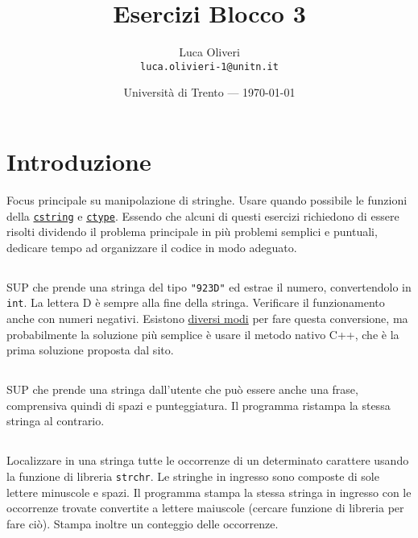 \documentclass{article}
\title{Esercizi Blocco 3} %
\author{Luca Oliveri\\ \texttt{luca.olivieri-1@unitn.it}} %
\date{Università di Trento --- \today} %
\begin{document}
\maketitle %

\section*{Introduzione} %

\setcounter{section}{3}
Focus principale su manipolazione di stringhe. Usare quando possibile le funzioni della \href{http://www.cplusplus.com/reference/cstring/}{\texttt{cstring}} e \href{http://www.cplusplus.com/reference/cctype/}{\texttt{ctype}}. Essendo che alcuni di questi esercizi richiedono di essere risolti dividendo il problema principale in più problemi semplici e puntuali, dedicare tempo ad organizzare il codice in modo adeguato.


\subsection{}
SUP che prende una stringa del tipo \texttt{"923D"} ed estrae il numero, convertendolo in \texttt{int}. La lettera D è sempre alla fine della stringa. Verificare il funzionamento anche con numeri negativi. Esistono \href{https://www.geeksforgeeks.org/converting-strings-numbers-cc/}{diversi modi} per fare questa conversione, ma probabilmente la soluzione più semplice è usare il metodo nativo C++, che è la prima soluzione proposta dal sito.

\subsection{}
SUP che prende una stringa dall'utente che può essere anche una frase, comprensiva quindi di spazi e punteggiatura. Il programma ristampa la stessa stringa al contrario.  

\subsection{}
Localizzare in una stringa tutte le occorrenze di un determinato carattere usando la funzione di libreria \texttt{strchr}. Le stringhe in ingresso sono composte di sole lettere minuscole e spazi. Il programma stampa la stessa stringa in ingresso con le occorrenze trovate convertite a lettere maiuscole (cercare funzione di libreria per fare ciò). Stampa inoltre un conteggio delle occorrenze.
\end{document}
